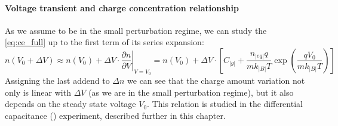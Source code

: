 		\paragraph{Voltage transient and charge concentration relationship}
		As we assume to be in the small perturbation regime, we can study the \cref{eq:ce_full} up to the first term of its series expansion:
		\begin{dmath}\label{eq:tpv_n_deltaV}
			n(V_0 + \Delta V) \approx n(V_0) + \Delta V \cdot \left.\frac{\partial n}{\partial V}\right\rvert_{V=V_0} = n(V_0) + \Delta V \cdot \left[C_|g| + \frac{n_|eq| q}{mk_|B|T}\exp(\frac{qV_0}{mk_|B|T})\right]
		\end{dmath}
		Assigning the last addend to $\Delta n$ we can see that the charge amount variation not only is linear with $\Delta V$ (as we are in the small perturbation regime), but it also depends on the steady state voltage $V_0$.
		This relation is studied in the differential capacitance () experiment, described further in this chapter.

